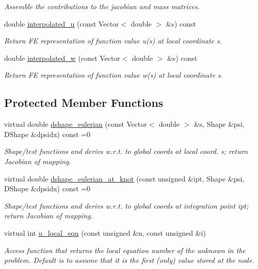 \begin{DoxyCompactItemize}
\begin{DoxyCompactList}\small\item\em Assemble the contributions to the jacobian and mass matrices. \end{DoxyCompactList}\item 
double \hyperlink{classComplexHarmonicEquations_a9e8774f4cf492bd267c0a170bf4f81a6}{interpolated\+\_\+u} (const Vector$<$ double $>$ \&s) const
\begin{DoxyCompactList}\small\item\em Return FE representation of function value u(s) at local coordinate s. \end{DoxyCompactList}\item 
double \hyperlink{classComplexHarmonicEquations_a73b34acf2038ae9c2ef3f3e61d9c1cd7}{interpolated\+\_\+w} (const Vector$<$ double $>$ \&s) const
\begin{DoxyCompactList}\small\item\em Return FE representation of function value w(s) at local coordinate s. \end{DoxyCompactList}\end{DoxyCompactItemize}
\subsection*{Protected Member Functions}
\begin{DoxyCompactItemize}
\item 
virtual double \hyperlink{classComplexHarmonicEquations_a59048c598e2fba3e11aa5985ffaf4d76}{dshape\+\_\+eulerian} (const Vector$<$ double $>$ \&s, Shape \&psi, D\+Shape \&dpsidx) const =0
\begin{DoxyCompactList}\small\item\em Shape/test functions and derivs w.\+r.\+t. to global coords at local coord. s; return Jacobian of mapping. \end{DoxyCompactList}\item 
virtual double \hyperlink{classComplexHarmonicEquations_a60c71828f2d4c1c2363dcb1d1f334fff}{dshape\+\_\+eulerian\+\_\+at\+\_\+knot} (const unsigned \&ipt, Shape \&psi, D\+Shape \&dpsidx) const =0
\begin{DoxyCompactList}\small\item\em Shape/test functions and derivs w.\+r.\+t. to global coords at integration point ipt; return Jacobian of mapping. \end{DoxyCompactList}\item 
virtual int \hyperlink{classComplexHarmonicEquations_a3538cae061c24db2db1fc277c0a09da4}{u\+\_\+local\+\_\+eqn} (const unsigned \&n, const unsigned \&i)
\begin{DoxyCompactList}\small\item\em Access function that returns the local equation number of the unknown in the problem. Default is to assume that it is the first (only) value stored at the node. \end{DoxyCompactList}\end{DoxyCompactItemize}


